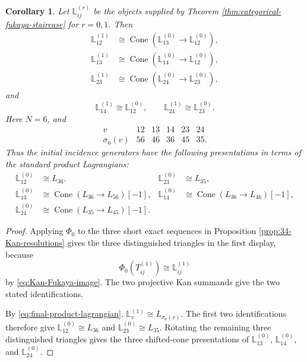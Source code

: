 \documentclass[12pt,a4paper,english,reqno]{amsart}
\theoremstyle{plain}
\newtheorem{corollary}[theorem]{Corollary}
\theoremstyle{definition}
\begin{document}
\begin{corollary}
\label{cor:34-twisted-complexes}
Let $\mathbb L_{ij}^{(r)}$ be the objects supplied by Theorem 
\ref{thm:categorical-fukaya-staircase} for $r=0,1$.  Then
\[
\begin{aligned}
 \mathbb L_{12}^{(1)}
 &\cong
 \operatorname{Cone}\!
 \left(
  \mathbb L_{13}^{(0)}
  \longrightarrow
  \mathbb L_{12}^{(0)}
 \right),\\
 \mathbb L_{13}^{(1)}
 &\cong
 \operatorname{Cone}\!
 \left(
  \mathbb L_{14}^{(0)}
  \longrightarrow
  \mathbb L_{12}^{(0)}
 \right),\\
 \mathbb L_{23}^{(1)}
 &\cong
 \operatorname{Cone}\!
 \left(
  \mathbb L_{24}^{(0)}
  \longrightarrow
  \mathbb L_{23}^{(0)}
 \right),
\end{aligned}
\]
and
\[
 \mathbb L_{14}^{(1)}\cong\mathbb L_{12}^{(0)},
 \qquad
 \mathbb L_{24}^{(1)}\cong\mathbb L_{23}^{(0)}.
\]
Here $N=6$, and
\[
\begin{array}{c|ccccc}
v&12&13&14&23&24\\ \hline
\sigma_6(v)&56&46&36&45&35.
\end{array}
\]
Thus the initial incidence generators have the following presentations in
terms of the standard product Lagrangians:
\[
\begin{aligned}
 \mathbb L_{12}^{(0)}
 &\cong L_{36},&
 \mathbb L_{23}^{(0)}
 &\cong L_{35},\\
 \mathbb L_{13}^{(0)}
 &\cong
 \operatorname{Cone}(L_{36}\longrightarrow L_{56})[-1],&
 \mathbb L_{14}^{(0)}
 &\cong
 \operatorname{Cone}(L_{36}\longrightarrow L_{46})[-1],\\
 \mathbb L_{24}^{(0)}
 &\cong
 \operatorname{Cone}(L_{35}\longrightarrow L_{45})[-1].
\end{aligned}
\]
\end{corollary}

\begin{proof}
Applying $\Phi_0$ to the three short exact sequences in
Proposition \ref{prop:34-Kan-resolutions} gives the three distinguished triangles in
the first display, because
\[
 \Phi_0(T_{ij}^{(1)})\cong\mathbb L_{ij}^{(1)}
\]
by \eqref{eq:Kan-Fukaya-image}.  The two projective Kan summands give the
two stated identifications.

By \eqref{eq:final-product-lagrangian}, $\mathbb L_v^{(1)}\cong L_{\sigma_6(v)}$.
The first two identifications therefore give
$\mathbb L_{12}^{(0)}\cong L_{36}$ and
$\mathbb L_{23}^{(0)}\cong L_{35}$.  Rotating the remaining three
distinguished triangles gives the three shifted-cone presentations of
$\mathbb L_{13}^{(0)}$, $\mathbb L_{14}^{(0)}$, and
$\mathbb L_{24}^{(0)}$.
\end{proof}
\end{document}
